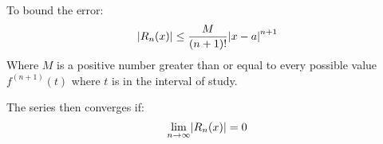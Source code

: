 \documentclass[12pt]{article}
\DeclarePairedDelimiter\abs{\lvert}{\rvert}
\begin{document}
To bound the error:
\[
  \abs*{R_n(x)} \le \frac{M}{(n+1)!}\abs*{x-a}^{n+1}
\]
Where \(M\) is a positive number greater than or equal to every possible value
\(f^{(n+1)}(t)\) where \(t\) is in the interval of study.

The series then converges if:
\[
  \lim_{n \to \infty} \abs*{R_n(x)} = 0
\]
\subsection*{}
\end{document}
